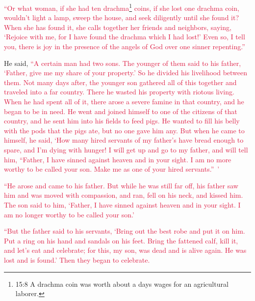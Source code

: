 \myverse{}\textcolor{crimson}{“Or what woman, if she had ten drachma}\footnote{15:8 A drachma coin was worth about a days wages for an agricultural laborer.}
\textcolor{crimson}{coins, if she lost one drachma coin, wouldn’t light a lamp, sweep the house, and seek diligently until
	she found it?
}
\myverse{}\textcolor{crimson}{When she has found it, she calls together her friends and neighbors, saying,
	‘Rejoice with me, for I have found the drachma which I had lost!’
}
\myverse{}\textcolor{crimson}{Even so, I tell you, there is joy in the presence of the angels of God
	over one sinner repenting.”}

\myverse{}He said, \textcolor{crimson}{“A certain man had two sons.} \myverse{}\textcolor{crimson}{The younger of them said to his father, ‘Father, give me my share of your property.’ So he divided his livelihood between them.} \myverse{}\textcolor{crimson}{Not many days after, the younger son gathered all of this together and traveled into a far country. There he wasted his property with riotous living.} \myverse{}\textcolor{crimson}{When he had spent all of it, there arose a severe famine in that country, and he began to be in need.} \myverse{}\textcolor{crimson}{He went and joined himself to one of the citizens of that country, and he sent him into his fields to feed pigs.} \myverse{}\textcolor{crimson}{He wanted to fill his belly with the pods that the pigs ate, but no one gave him any.} \myverse{}\textcolor{crimson}{But when he came to himself, he said, ‘How many hired servants of my father’s have bread enough to spare, and I’m dying with hunger!} \myverse{}\textcolor{crimson}{I will get up and go to my father, and will tell him, “Father, I have	sinned against heaven and in your sight.} \myverse{}\textcolor{crimson}{I am no more worthy to be called your son. Make me as one of your hired servants.” ’}

\myverse{}\textcolor{crimson}{“He arose and came to his father. But while he was still
	far off, his father saw him and was moved with compassion, and ran, fell on his neck, and kissed him.
}
\myverse{}\textcolor{crimson}{The son said to him, ‘Father, I have sinned against heaven and in your
	sight. I am no longer worthy to be called your son.’}

\myverse{}\textcolor{crimson}{“But the father said to his servants, ‘Bring out the best
	robe and put it on him. Put a ring on his hand and sandals on his feet.
}
\myverse{}\textcolor{crimson}{Bring the fattened calf, kill it, and let’s eat and celebrate;
}
\myverse{}\textcolor{crimson}{for this, my son, was dead and is alive again. He was lost and is found.’
	Then they began to celebrate.}

